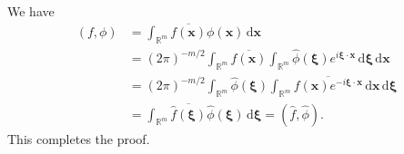 \begin{Proof}
We have
\begin{equation}\label{eq:fourier-inner-product-preservation-proof}
\begin{aligned}
(f,\phi)&=\int_{\mathbb{R}^m}\overline{f(\bm{x})}\phi(\bm{x})\,\mathrm{d}\bm{x}\\
&=(2\pi)^{-m/2}\int_{\mathbb{R}^m}\overline{f(\bm{x})}\int_{\mathbb{R}^m}\widehat\phi(\bm{\xi})e^{i\bm{\xi}\cdot\bm{x}}\,\mathrm{d}\bm{\xi}\,\mathrm{d}\bm{x}\\
&=(2\pi)^{-m/2}\int_{\mathbb{R}^m}\widehat\phi(\bm{\xi})\int_{\mathbb{R}^m}\overline{f(\bm{x})e^{-i\bm{\xi}\cdot\bm{x}}}\,\mathrm{d}\bm{x}\,\mathrm{d}\bm{\xi}\\
&=\int_{\mathbb{R}^m}\overline{\widehat f(\bm{\xi})}\widehat\phi(\bm{\xi})\,\mathrm{d}\bm{\xi}=(\widehat f,\widehat\phi).
\end{aligned}
\end{equation}
This completes the proof.
\end{Proof}
